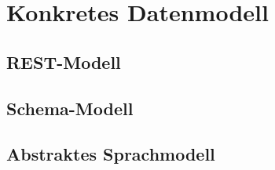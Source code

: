 \section{Konkretes Datenmodell}
\label{sec:concrete_model}

\subsection{REST-Modell}
\label{sec:rest_model}

\subsection{Schema-Modell}
\label{sec:schema_model}

\subsection{Abstraktes Sprachmodell}
\label{sec:abstract_language_model}

